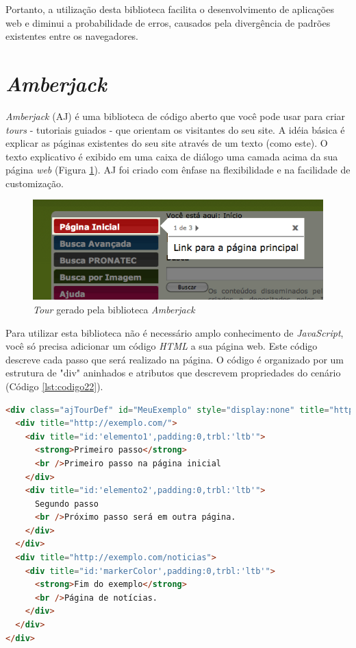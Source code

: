 Portanto, a utilização desta biblioteca facilita o desenvolvimento de aplicações web e diminui a probabilidade de erros, causados pela divergência de padrões existentes entre os navegadores.

\section{\textit{Amberjack}}
\label{sec:amberjack}

\textit{Amberjack} (AJ) é uma biblioteca de código aberto que você pode usar para criar \textit{tours} - tutoriais guiados - que orientam os visitantes do seu site. A idéia básica é explicar as páginas existentes do seu site através de um texto (como este). O texto explicativo é exibido em uma caixa de diálogo uma camada acima da sua página \textit{web} (Figura \ref{figura_22}). AJ foi criado com ênfase na flexibilidade e na facilidade de customização.

\begin{figure}[ht]
    \centering
    \includegraphics[width=0.9 \textwidth]{figuras/figura_33}
    \caption{\textit{Tour} gerado pela biblioteca \textit{Amberjack}}
    \label{figura_22}
\end{figure}

Para utilizar esta biblioteca não é necessário amplo conhecimento de \textit{JavaScript}, você só precisa adicionar um código \textit{HTML} a sua página web. Este código descreve cada passo que será realizado na página. O código é organizado por um estrutura de "div" aninhados e atributos que descrevem propriedades do cenário (Código \ref{lst:codigo22}).

{\singlespace
\begin{lstlisting}[caption=Estrutura do código \textit{HTML} do \textit{Amberjack},language=HTML,label={lst:codigo23}]
<div class="ajTourDef" id="MeuExemplo" style="display:none" title="http://feedback.exemplo.com/">
  <div title="http://exemplo.com/">
    <div title="id:'elemento1',padding:0,trbl:'ltb'">
      <strong>Primeiro passo</strong>
      <br />Primeiro passo na página inicial
    </div>
    <div title="id:'elemento2',padding:0,trbl:'ltb'">
      Segundo passo
      <br />Próximo passo será em outra página.
    </div>    
  </div>
  <div title="http://exemplo.com/noticias">
    <div title="id:'markerColor',padding:0,trbl:'ltb'">
      <strong>Fim do exemplo</strong>
      <br />Página de notícias.
    </div>
  </div>
</div>
\end{lstlisting}
}

